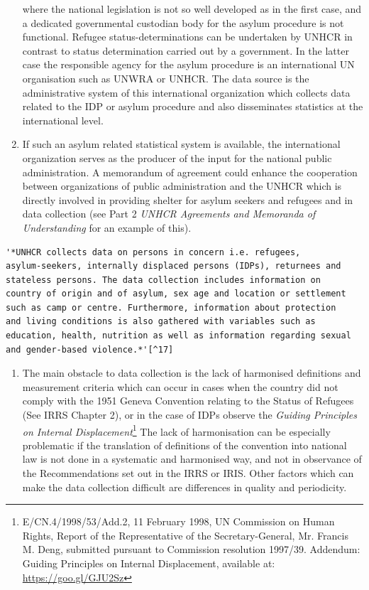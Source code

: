 \documentclass[
]{article}
\providecommand{\tightlist}{%
  \setlength{\itemsep}{0pt}\setlength{\parskip}{0pt}}
\begin{document}
\begin{enumerate}
  where the national legislation is not so well developed as in the
  first case, and a dedicated governmental custodian body for the
  asylum procedure is not functional. Refugee status-determinations
  can be undertaken by UNHCR in contrast to status determination
  carried out by a government. In the latter case the responsible
  agency for the asylum procedure is an international UN organisation
  such as UNWRA or UNHCR. The data source is the administrative system
  of this international organization which collects data related to
  the IDP or asylum procedure and also disseminates statistics at the
  international level.
\item
  If such an asylum related statistical system is available, the
  international organization serves as the producer of the input for
  the national public administration. A memorandum of agreement could
  enhance the cooperation between organizations of public
  administration and the UNHCR which is directly involved in providing
  shelter for asylum seekers and refugees and in data collection (see
  Part 2 \emph{UNHCR Agreements and Memoranda of Understanding} for an
  example of this).
\end{enumerate}

\begin{verbatim}
'*UNHCR collects data on persons in concern i.e. refugees,
asylum-seekers, internally displaced persons (IDPs), returnees and
stateless persons. The data collection includes information on
country of origin and of asylum, sex age and location or settlement
such as camp or centre. Furthermore, information about protection
and living conditions is also gathered with variables such as
education, health, nutrition as well as information regarding sexual
and gender-based violence.*'[^17]
\end{verbatim}

\begin{enumerate}
\def\labelenumi{\arabic{enumi}.}
\setcounter{enumi}{277}
\tightlist
\item
  The main obstacle to data collection is the lack of harmonised
  definitions and measurement criteria which can occur in cases when
  the country did not comply with the 1951 Geneva Convention relating
  to the Status of Refugees (See IRRS Chapter 2), or in the case of
  IDPs observe the \emph{Guiding Principles on Internal Displacement}\footnote{E/CN.4/1998/53/Add.2, 11 February 1998, UN Commission on Human
    Rights, Report of the Representative of the Secretary-General, Mr.
    Francis M. Deng, submitted pursuant to Commission resolution
    1997/39. Addendum: Guiding Principles on Internal Displacement,
    available at: \url{https://goo.gl/GJU2Sz}}
  The lack of harmonisation can be especially problematic if the
  translation of definitions of the convention into national law is
  not done in a systematic and harmonised way, and not in observance
  of the Recommendations set out in the IRRS or IRIS. Other factors
  which can make the data collection difficult are differences in
  quality and periodicity.
\end{enumerate}
\end{document}
